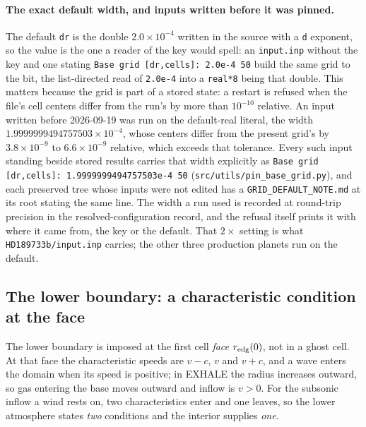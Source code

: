 \documentclass[english,a4paper]{my_memo}
\begin{document}
\paragraph{The exact default width, and inputs written before it was pinned.}
The default \texttt{dr} is the double $2.0\times10^{-4}$ written in the
source with a \texttt{d} exponent, so the value is the one a reader of the
key would spell: an \texttt{input.inp} without the key and one stating
\texttt{Base grid [dr,cells]: 2.0e-4 50} build the same grid to the bit, the
list-directed read of \texttt{2.0e-4} into a \texttt{real*8} being that
double.  This matters because the grid is part of a stored state: a restart
is refused when the file's cell centers differ from the run's by more than
$10^{-10}$ relative.  An input written before 2026-09-19 was run on the
default-real literal, the width $1.9999999494757503\times10^{-4}$, whose
centers differ from the present grid's by $3.8\times10^{-9}$ to
$6.6\times10^{-9}$ relative, which exceeds that tolerance.  Every such input
standing beside stored results carries that width explicitly as
\texttt{Base grid [dr,cells]: 1.9999999494757503e-4 50}
(\texttt{src/utils/pin\_base\_grid.py}), and each preserved tree whose
inputs were not edited has a \texttt{GRID\_DEFAULT\_NOTE.md} at its root
stating the same line.  The width a run used is recorded at round-trip
precision in the resolved-configuration record, and the refusal itself prints
it with where it came from, the key or the default. That $2\times$
setting is what \texttt{HD189733b/input.inp} carries; the other three production
planets run on the default.

\subsection{The lower boundary: a characteristic condition at the face}
\label{sec:basebc}
The lower boundary is imposed at the first cell \emph{face} $r_{\rm edg}(0)$,
not in a ghost cell. At that face the characteristic speeds are $v-c$, $v$ and
$v+c$, and a wave enters the domain when its speed is positive; in EXHALE the
radius increases outward, so gas entering the base moves outward and inflow is
$v>0$. For the subsonic inflow a wind rests on, two characteristics enter and
one leaves, so the lower atmosphere states \emph{two} conditions and the
interior supplies \emph{one}.
\end{document}
